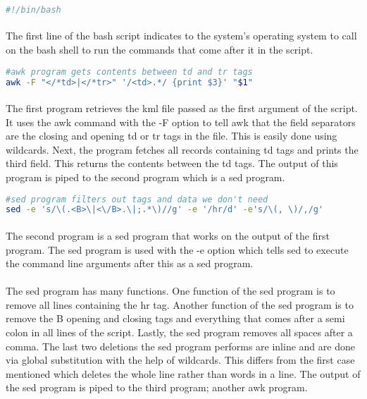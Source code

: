 \documentclass[]{article}
\begin{document}
\begin{lstlisting}[language=Bash, caption = First line of Bash script]
#!/bin/bash
\end{lstlisting}
\paragraph{}The first line of the bash script indicates to the system's operating system to call on the bash shell to run the commands that come after it in the script.

\begin{lstlisting}[language=Bash, caption = First program]
#awk program gets contents between td and tr tags
awk -F "</*td>|</*tr>" '/<td>.*/ {print $3}' "$1" 
\end{lstlisting}
\paragraph{}The first program retrieves the kml file passed as the first argument of the script. It uses the awk command with the -F option to tell awk that the field separators are the closing and opening td or tr tags in the file. This is easily done using wildcards. Next, the program fetches all records containing td tags and prints the third field. This returns the contents between the td tags. The output of this program is piped to the second program which is a sed program.

\begin{lstlisting}[language=Bash, caption = Second program]
#sed program filters out tags and data we don't need
sed -e 's/\(.<B>\|<\/B>.\|;.*\)//g' -e '/hr/d' -e's/\(, \)/,/g'
\end{lstlisting}
\paragraph{}The second program is a sed program that works on the output of the first program. The sed program is used with the -e option which tells sed to execute the command line arguments after this as a sed program. 
\paragraph{}The sed program has many functions. One function of the sed program is to remove all lines containing the hr tag. Another function of the sed program is to remove the B opening and closing tags and everything that comes after a semi colon in all lines of the script. Lastly, the sed program removes all spaces after a comma. The last two deletions the sed program performs are inline and are done via global substitution with the help of wildcards. This differs from the first case mentioned which deletes the whole line rather than words in a line. The output of the sed program is piped to the third program; another awk program.
\end{document}
